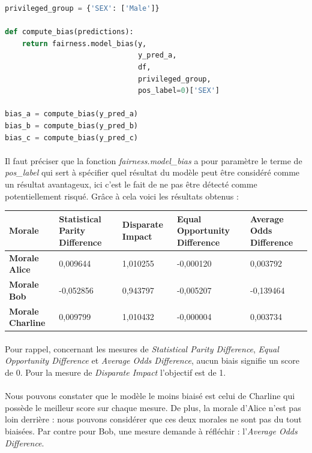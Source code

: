 \documentclass[10pt, french, a4paper]{report}
\begin{document}
\begin{lstlisting}[language=python]
privileged_group = {'SEX': ['Male']}

def compute_bias(predictions):
    return fairness.model_bias(y, 
                               y_pred_a, 
                               df, 
                               privileged_group, 
                               pos_label=0)['SEX'] 

bias_a = compute_bias(y_pred_a)
bias_b = compute_bias(y_pred_b)
bias_c = compute_bias(y_pred_c)
\end{lstlisting}
  
\paragraph{}
Il faut préciser que la fonction \textit{fairness.model\_bias} a pour paramètre le terme de \textit{pos\_label} qui sert à spécifier quel résultat du modèle peut être considéré comme un résultat avantageux, ici c'est le fait de ne pas être détecté comme potentiellement risqué. Grâce à cela voici les résultats obtenus :

\begin{center}
  \begin{tabularx}{13cm}{ |l|X|X|X|X| } 
    \hline 
     Morale & Statistical Parity Difference & Disparate Impact & Equal Opportunity Difference & Average Odds Difference \\
    \hline
    \hline
    \textbf{Morale Alice} & 0,009644 & 1,010255 & -0,000120 & 0,003792 \\
    \textbf{Morale Bob} & -0,052856 & 0,943797 & -0,005207 & -0,139464\\
    \textbf{Morale Charline} & 0,009799 & 1,010432 & -0,000004 & 0,003734 \\
    \hline
  \end{tabularx}
\end{center}

\paragraph{}
Pour rappel, concernant les mesures de \textit{Statistical Parity Difference}, \textit{Equal Opportunity Difference} et \textit{Average Odds Difference}, aucun biais signifie un score de 0. Pour la mesure de \textit{Disparate Impact} l'objectif est de 1.

\paragraph{}
Nous pouvons constater que le modèle le moins biaisé est celui de Charline qui possède le meilleur score sur chaque mesure. De plus, la morale d'Alice n'est pas loin derrière : nous pouvons considérer que ces deux morales ne sont pas du tout biaisées. Par contre pour Bob, une mesure demande à réfléchir : l'\textit{Average Odds Difference}.
\end{document}
